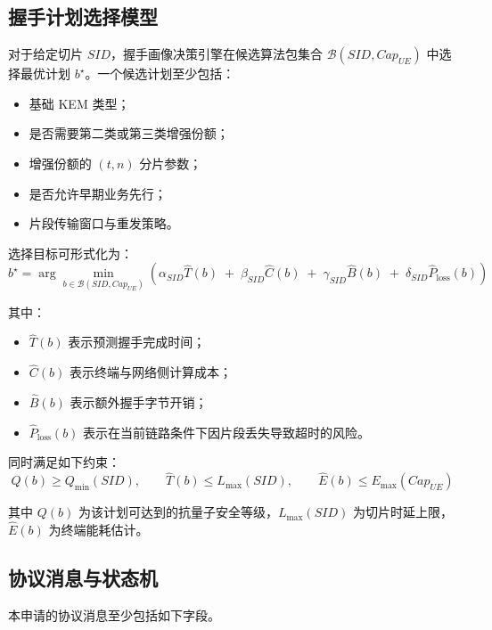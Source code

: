\documentclass[12pt,a4paper]{article}
\begin{document}
\subsection{握手计划选择模型}

对于给定切片 $SID$，握手画像决策引擎在候选算法包集合 $\mathcal{B}(SID,Cap_{UE})$ 中选择最优计划 $b^\star$。一个候选计划至少包括：

\begin{itemize}[leftmargin=2em]
    \item 基础 KEM 类型；
    \item 是否需要第二类或第三类增强份额；
    \item 增强份额的 $(t,n)$ 分片参数；
    \item 是否允许早期业务先行；
    \item 片段传输窗口与重发策略。
\end{itemize}

选择目标可形式化为：
\[
b^\star
=
\arg\min_{b \in \mathcal{B}(SID,Cap_{UE})}
\left(
\alpha_{SID}\hat{T}(b)
\;+\;
\beta_{SID}\hat{C}(b)
\;+\;
\gamma_{SID}\hat{B}(b)
\;+\;
\delta_{SID}\hat{P}_{\mathrm{loss}}(b)
\right)
\]

其中：

\begin{itemize}[leftmargin=2em]
    \item $\hat{T}(b)$ 表示预测握手完成时间；
    \item $\hat{C}(b)$ 表示终端与网络侧计算成本；
    \item $\hat{B}(b)$ 表示额外握手字节开销；
    \item $\hat{P}_{\mathrm{loss}}(b)$ 表示在当前链路条件下因片段丢失导致超时的风险。
\end{itemize}

同时满足如下约束：
\[
Q(b)\ge Q_{\min}(SID), \qquad
\hat{T}(b)\le L_{\max}(SID), \qquad
\hat{E}(b)\le E_{\max}(Cap_{UE})
\]

其中 $Q(b)$ 为该计划可达到的抗量子安全等级，$L_{\max}(SID)$ 为切片时延上限，$\hat{E}(b)$ 为终端能耗估计。

\subsection{协议消息与状态机}

本申请的协议消息至少包括如下字段。
\end{document}
